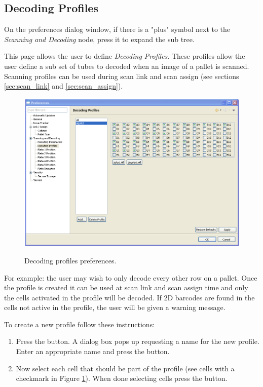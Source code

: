 \subsection{Decoding Profiles}
On the preferences dialog window, if there is a "plus" symbol next to the
\emph{Scanning and Decoding} node, press it to expand the sub tree.

This page allows the user to define \emph{Decoding Profiles}. These profiles
allow the user define a sub set of tubes to decoded when an image of a pallet
is scanned. Scanning profiles can be used during scan link and scan assign (see
sections \ref{sec:scan_link} and \ref{sec:scan_assign}).
    \begin{figure}[H]
      \centering
      \scalebox{0.45}
      { \includegraphics*{screenshots/configuration/prefs_decoding_profiles} }
      \caption{Decoding profiles preferences.}
      \label{fig:prefs_decoding_profiles}
    \end{figure}
For example: the user may wish to only decode every other row on a pallet. Once
the profile is created it can be used at scan link and scan assign time and
only the cells activated in the profile will be decoded. If 2D barcodes are
found in the cells not active in the profile, the user will be given a warning
message.

To create a new profile follow these instructions:
\begin{enumerate}
  \item Press the  button. A dialog box pops up requesting a name
    for the new profile. Enter an appropriate name and press the 
    button.
  \item Now select each cell that should be part of the profile (see cells with
    a checkmark in Figure \ref{fig:prefs_decoding_profiles}). When done
    selecting cells press the  button.
\end{enumerate}
\clearpage


